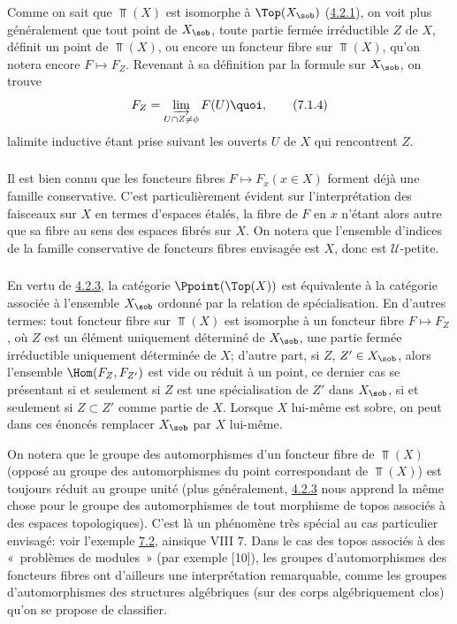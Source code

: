 \documentclass[10pt]{../fichiers-configuration-latex/smfart}
\begin{document}
Comme on sait que $\Top(X)$ est isomorphe à $\Top(X_{\sob})$
(\hyperref[IV.subsubsec4.2.1]{4.2.1}), on voit plus généralement que tout point
de $X_{\sob}$, \ie toute partie fermée irréductible $Z$ de $X$,
définit un point de $\Top(X)$, ou encore un foncteur fibre sur
$\Top(X)$, qu'on notera encore $F\mapsto F_Z$. Revenant à sa
définition par la formule  sur $X_{\sob}$, on trouve
\begin{equation*}
F_Z=\varinjlim_{U\cap Z\neq \phi} F(U){\quoi},\tag{7.1.4}
\end{equation*}
la\pageoriginale limite inductive étant prise suivant les ouverts
$U$ de $X$ qui rencontrent $Z$.

\setcounter{subsubsection}{4}
\subsubsection{}
Il est bien connu que les foncteurs fibres $F\mapsto F_x(x\in X)$
forment déjà une famille conservative. C'est particulièrement
évident sur l'interprétation des faisceaux sur $X$ en termes
d'espaces étalés, la fibre de $F$ en $x$ n'étant alors autre que sa
fibre au sens des espaces fibrés sur $X$. On notera que l'ensemble
d'indices de la famille conservative de foncteurs fibres envisagée
est $X$, donc est $𝒰$-petite.

\subsubsection{}
En vertu de \hyperref[IV.subsubsec4.2.3]{4.2.3}, la catégorie $\Ppoint(\Top(X))$
est équivalente à la catégorie associée à l'ensemble $X_{\sob}$
ordonné par la relation de spécialisation. En d'autres termes: tout
foncteur fibre sur $\Top(X)$ est isomorphe à un foncteur fibre
$F\mapsto F_Z$, où $Z$ est un élément uniquement déterminé de
$X_{\sob}$, \ie une partie fermée irréductible uniquement
déterminée
de $X$; d'autre part, si $Z$, $Z'\in X_{\sob}$, alors l'ensemble
$\Hom(F_Z,F_{Z'})$ est vide ou réduit à un point, ce dernier cas se
présentant si et seulement si $Z$ est une spécialisation de $Z'$
dans $X_{\sob}$, \ie si et seulement si $Z\subset Z'$ comme partie
de $X$. Lorsque $X$ lui-même est sobre, on peut dans ces énoncés
remplacer $X_{\sob}$ par $X$ lui-même.

On notera que le groupe des automorphismes d'un foncteur fibre de
$\Top(X)$ (opposé au groupe des automorphismes du point
correspondant de $\Top(X)$) est toujours réduit au groupe unité
(plus généralement, \hyperref[IV.subsubsec4.2.3]{4.2.3} nous apprend la même
chose pour le groupe des automorphismes de tout morphisme de topos
associés à des espaces topologiques). C'est là un phénomène très
spécial au cas particulier envisagé: voir l'exemple
\hyperref[IV.subsec7.2]{7.2}, ainsi\pageoriginale que VIII 7. Dans le cas des
topos associés à des « problèmes de modules »  (\cf par exemple
[10]), les groupes d'automorphismes des foncteurs fibres ont
d'ailleurs une interprétation remarquable, comme les groupes
d'automorphismes des structures algébriques (sur des corps
algébriquement clos) qu'on se propose de classifier.
\end{document}
